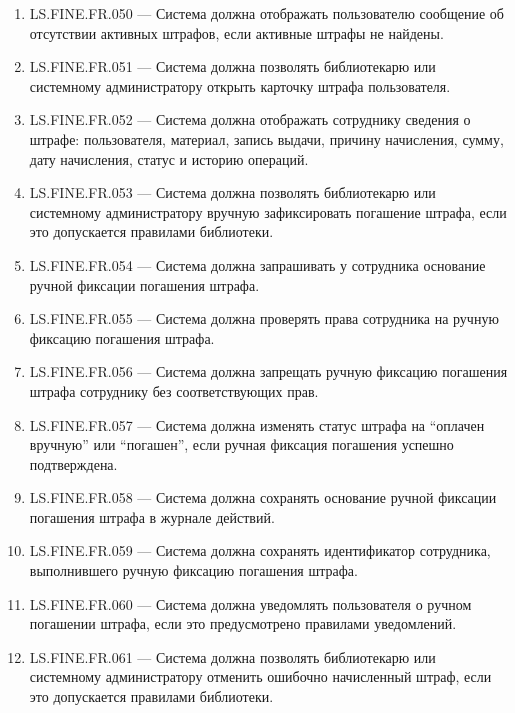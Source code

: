 \documentclass[12pt,a4paper]{article}
\begin{document}
\begin{enumerate}
		\item LS.FINE.FR.050 --- Система должна отображать пользователю сообщение об
		отсутствии активных штрафов, если активные штрафы не найдены.
		
		\item LS.FINE.FR.051 --- Система должна позволять библиотекарю или системному
		администратору открыть карточку штрафа пользователя.
		
		\item LS.FINE.FR.052 --- Система должна отображать сотруднику сведения о штрафе:
		пользователя, материал, запись выдачи, причину начисления, сумму, дату начисления,
		статус и историю операций.
		
		\item LS.FINE.FR.053 --- Система должна позволять библиотекарю или системному
		администратору вручную зафиксировать погашение штрафа, если это допускается
		правилами библиотеки.
		
		\item LS.FINE.FR.054 --- Система должна запрашивать у сотрудника основание ручной
		фиксации погашения штрафа.
		
		\item LS.FINE.FR.055 --- Система должна проверять права сотрудника на ручную
		фиксацию погашения штрафа.
		
		\item LS.FINE.FR.056 --- Система должна запрещать ручную фиксацию погашения
		штрафа сотруднику без соответствующих прав.
		
		\item LS.FINE.FR.057 --- Система должна изменять статус штрафа на ``оплачен вручную''
		или ``погашен'', если ручная фиксация погашения успешно подтверждена.
		
		\item LS.FINE.FR.058 --- Система должна сохранять основание ручной фиксации
		погашения штрафа в журнале действий.
		
		\item LS.FINE.FR.059 --- Система должна сохранять идентификатор сотрудника,
		выполнившего ручную фиксацию погашения штрафа.
		
		\item LS.FINE.FR.060 --- Система должна уведомлять пользователя о ручном погашении
		штрафа, если это предусмотрено правилами уведомлений.
		
		\item LS.FINE.FR.061 --- Система должна позволять библиотекарю или системному
		администратору отменить ошибочно начисленный штраф, если это допускается
		правилами библиотеки.
		

\end{enumerate}
\end{document}
